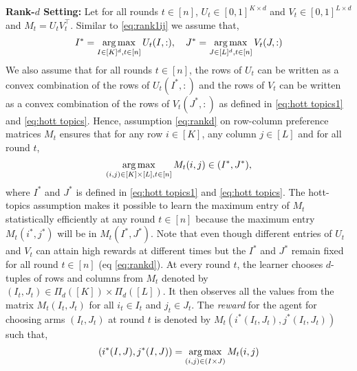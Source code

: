 \textbf{Rank-$d$ Setting:} Let for all rounds $t\in[n]$, $U_t \in [0,1]^{K\times d}$ and $V_t \in [0,1]^{L\times d}$ and $M_t = U_t V_t^{\intercal}$. Similar to \eqref{eq:rank1ij} we assume that,
\begin{align}
I^\ast = \mathop{\rm arg\,max}_{I\in[K]^d, t\in [n]}U_{t}(I,:), \hspace*{1em} J^\ast = \mathop{\rm arg\,max}_{J\in[L]^d, t\in [n]}V_{t}(J,:) \label{eq:rankd}
\end{align}
We also assume that for all rounds $t\in [n]$, the rows of $U_t$ can be written as a convex combination of the rows of $U_t(I^\ast, :)$ and the rows of $V_t$ can be written as a convex combination of the rows of $V_t(J^\ast, :)$ as defined in \eqref{eq:hott topics1} and \eqref{eq:hott topics}. Hence, assumption \eqref{eq:rankd} on row-column preference matrices $M_t$ ensures that for any row $i \in [K]$, any column $j \in [L]$ and for all round $t$,
\begin{align}
  \mathop{\rm arg\,max}_{(i, j) \in [K] \times [L], t\in [n]} M_t(i, j) \in (I^\ast, J^\ast) \label{eq:rewardProp},
\end{align}
where $I^\ast$ and $J^\ast$ is defined in \eqref{eq:hott topics1} and \eqref{eq:hott topics}. The hott-topics assumption makes it possible to learn the maximum entry of $M_t$ statistically efficiently at any round $t\in[n]$ because the maximum entry $M_t(i^*,j^*)$ will be in $M_t(I^*,J^*)$. Note that even though different entries of $U_t$ and $V_t$ can attain high rewards at different times but the $I^*$ and $J^*$ remain fixed for all round $t\in[n]$ (eq \ref{eq:rankd}). 
At every round $t$, the learner chooses $d$-tuples of rows and columns from $M_t$ denoted by $(I_t,J_t)\in \Pi_d([K])\times \Pi_d([L])$. It then observes all the values from the matrix $M_{t}(I_t,J_t)$ for all $i_t\in I_t$ and $j_t \in J_t$. The \emph{reward} for the agent for choosing arms $(I_t,J_t)$ at round $t$ is denoted by $M_t(i^\ast(I_t,J_t),j^\ast(I_t,J_t))$ such that,
\begin{align}
  (i^\ast(I,J),j^\ast(I,J)) = \mathop{\rm arg\,max}_{(i,j) \in (I\times J)} M_{t}(i,j)
  \label{eq:reward}
\end{align}


